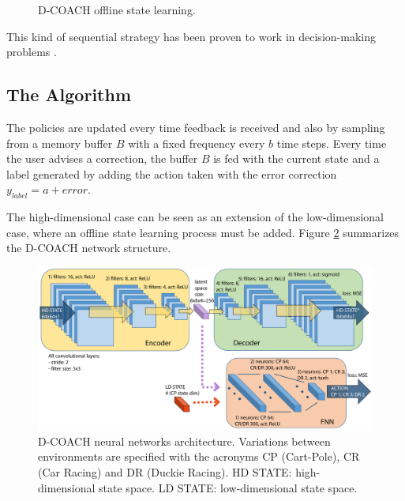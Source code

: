 \begin{figure}
\centering
{}
\hspace{0.1cm}
\caption{D-COACH offline state learning.} 
\label{fig:ms} 
\end{figure}

This kind of sequential strategy has been proven to work in decision-making problems \cite{Warnell2017,Finn2015,Ha2018}.

\subsection{The Algorithm}
The policies are updated every time feedback is received and also by sampling from a memory buffer $B$ with a fixed frequency every $b$ time steps. Every time the user advises a correction, the buffer $B$ is fed with the current state and a label generated by adding the action taken with the error correction $y_{label}=a+\mathit{error}$.

The high-dimensional case can be seen as an extension of the low-dimensional case, where an offline state learning process must be added. Figure \ref{fig:network_diagram} summarizes the D-COACH network structure.

\begin{figure}[h]
    \centering
    \includegraphics[width=1.0\linewidth]{imagenes/cap2/ISER_diagram.pdf}
    \caption{D-COACH neural networks architecture. Variations between environments are specified with the acronyms CP (Cart-Pole), CR (Car Racing) and DR (Duckie Racing). HD STATE: high-dimensional state space. LD STATE: low-dimensional state space.}
    \label{fig:network_diagram}
\end{figure}


